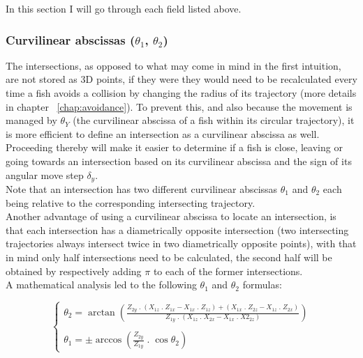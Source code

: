 In this section I will go through each field listed above.

\subsubsection{Curvilinear abscissas ($\theta_1$, $\theta_2$)}
The intersections, as opposed to what may come in mind in the first intuition, are not stored as 3D points, if they were they would need to be recalculated every time a fish avoids a collision by changing the radius of its trajectory (more details in chapter ~\ref{chap:avoidance}). To prevent this, and also because the movement is managed by $\theta_Y$ (the curvilinear abscissa of a fish within its circular trajectory), it is more efficient to define an intersection as a curvilinear abscissa as well. Proceeding thereby will make it easier to determine if a fish is close, leaving or going towards an intersection based on its curvilinear abscissa and the sign of its angular move step $\delta _{y}$.\\

Note that an intersection has two different curvilinear abscissas $\theta_1$ and $\theta_2$ each being relative to the corresponding intersecting trajectory.\\

Another advantage of using a curvilinear abscissa to locate an intersection, is that each intersection has a diametrically opposite intersection (two intersecting trajectories always intersect twice in two diametrically opposite points), with that in mind only half intersections need to be calculated, the second half will be obtained by respectively adding $\pi$ to each of the former intersections.\\

A mathematical analysis led to the following $\theta_1$ and $\theta_2$ formulas:

\[
\left\{
\begin{array}{ll}
	\theta_2  = \arctan \left(
	\frac{\displaystyle Z_{2y} \;.\; (X_{1z} \;.\; Z_{1x} - X_{1x} \;.\; Z_{1z}) + (X_{1x} \;.\; Z_{2z} - X_{1z} \;.\; Z_{2x})}{\displaystyle Z_{1y} \;.\; (X_{1z} \;.\; X_{2x} - X_{1x} \;.\; X2_{2z})}
	\right) \\ \\
	
	\theta_1 = \pm \arccos\left(  \frac{\displaystyle Z_{2y}} {\displaystyle Z_{1y}} \;.\; \cos \theta_2 \right)
\end{array}
\right.
\]

